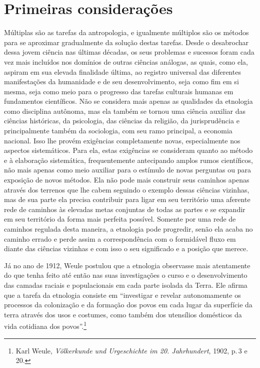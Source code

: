 \chapter*{Primeiras considerações\smallskip{}}

Múltiplas são as tarefas da antropologia, e igualmente múltiplos são os
métodos para se aproximar gradualmente da solução destas tarefas. Desde
o desabrochar dessa jovem ciência nas últimas décadas, os seus problemas
e sucessos foram cada vez mais incluídos nos domínios de outras ciências
análogas, as quais, como ela, aspiram em sua elevada finalidade última,
ao registro universal das diferentes manifestações da humanidade e de
seu desenvolvimento, seja como fim em si mesma, seja como meio para o
progresso das tarefas culturais humanas em fundamentos científicos. Não
se considera mais apenas as qualidades da etnologia como disciplina
autônoma, mas ela também se tornou uma ciência auxiliar das ciências
históricas, da psicologia, das ciências da religião, da jurisprudência
e principalmente também da sociologia, com seu ramo principal, a
economia nacional. Isso lhe provém exigências completamente novas,
especialmente nos aspectos sistemáticos. Para ela, estas exigências se
consideram quanto ao método e à elaboração sistemática, frequentemente
antecipando amplos rumos científicos, não mais apenas como meio
auxiliar para o estímulo de novas perguntas ou para exposição de novos
métodos. Ela não pode mais construir seus caminhos apenas através dos
terrenos que lhe cabem seguindo o exemplo dessas ciências vizinhas, mas
de sua parte ela precisa contribuir para ligar em seu território uma
aferente rede de caminhos às elevadas metas conjuntas de todas as
partes e se expandir em seu território da forma mais perfeita possível.
Somente por uma rede de caminhos regulada desta maneira, a etnologia
pode progredir, senão ela acaba no caminho errado e perde assim a
correspondência com o formidável fluxo em diante das ciências vizinhas e
com isso o seu significado e a posição que merece.

Já no ano de 1912, Weule postulou que a etnologia observasse mais
atentamente do que tenha feito até então nas suas investigações o curso
e o desenvolvimento das camadas raciais e populacionais em cada parte
isolada da Terra. Ele afirma que a tarefa da etnologia consiste em
``investigar e revelar autonomamente os processos da colonização e da
formação dos povos em cada lugar da superfície da terra através dos usos
e costumes, como também dos utensílios domésticos da vida cotidiana dos
povos''.\footnote{Karl Weule, \textit{Völkerkunde und Urgeschichte im 20.
  Jahrhundert}, 1902, p.\,3 e 20.}

